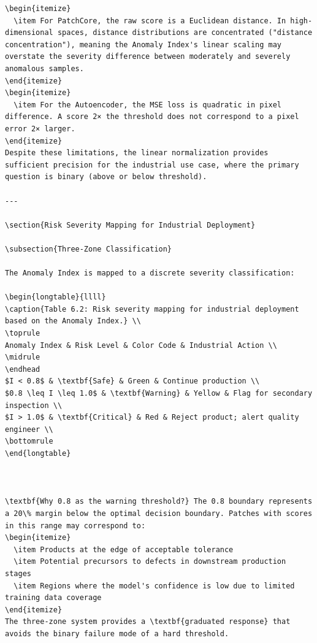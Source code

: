 \documentclass[12pt,a4paper,oneside]{report}
\begin{document}
\begin{verbatim}
\begin{itemize}
  \item For PatchCore, the raw score is a Euclidean distance. In high-dimensional spaces, distance distributions are concentrated ("distance concentration"), meaning the Anomaly Index's linear scaling may overstate the severity difference between moderately and severely anomalous samples.
\end{itemize}
\begin{itemize}
  \item For the Autoencoder, the MSE loss is quadratic in pixel difference. A score 2× the threshold does not correspond to a pixel error 2× larger.
\end{itemize}
Despite these limitations, the linear normalization provides sufficient precision for the industrial use case, where the primary question is binary (above or below threshold).

---

\section{Risk Severity Mapping for Industrial Deployment}

\subsection{Three-Zone Classification}

The Anomaly Index is mapped to a discrete severity classification:

\begin{longtable}{llll}
\caption{Table 6.2: Risk severity mapping for industrial deployment based on the Anomaly Index.} \\
\toprule
Anomaly Index & Risk Level & Color Code & Industrial Action \\
\midrule
\endhead
$I < 0.8$ & \textbf{Safe} & Green & Continue production \\
$0.8 \leq I \leq 1.0$ & \textbf{Warning} & Yellow & Flag for secondary inspection \\
$I > 1.0$ & \textbf{Critical} & Red & Reject product; alert quality engineer \\
\bottomrule
\end{longtable}



\textbf{Why 0.8 as the warning threshold?} The 0.8 boundary represents a 20\% margin below the optimal decision boundary. Patches with scores in this range may correspond to:
\begin{itemize}
  \item Products at the edge of acceptable tolerance
  \item Potential precursors to defects in downstream production stages
  \item Regions where the model's confidence is low due to limited training data coverage
\end{itemize}
The three-zone system provides a \textbf{graduated response} that avoids the binary failure mode of a hard threshold.


\end{verbatim}
\end{document}
